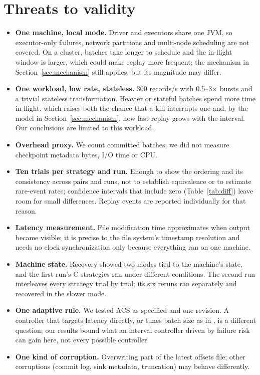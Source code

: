\documentclass[10pt,twocolumn]{article}
\begin{document}
\section{Threats to validity}
\label{sec:threats}

\begin{itemize}
\item \textbf{One machine, local mode.} Driver and executors share one JVM, so
executor-only failures, network partitions and multi-node scheduling are not
covered. On a cluster, batches take longer to schedule and the in-flight window
is larger, which could make replay more frequent; the mechanism in
Section~\ref{sec:mechanism} still applies, but its magnitude may differ.
\item \textbf{One workload, low rate, stateless.} 300 records/s with
0.5--3$\times$ bursts and a trivial stateless transformation. Heavier or
stateful batches spend more time in flight, which raises both the chance that a
kill interrupts one and, by the model in Section~\ref{sec:mechanism}, how fast
replay grows with the interval. Our conclusions are limited to this workload.
\item \textbf{Overhead proxy.} We count committed batches; we did not measure
checkpoint metadata bytes, I/O time or CPU.
\item \textbf{Ten trials per strategy and run.} Enough to show the ordering
and its consistency across pairs and runs, not to establish equivalence or to
estimate rare-event rates; confidence intervals that include zero
(Table~\ref{tab:diff}) leave room for small differences. Replay events are
reported individually for that reason.
\item \textbf{Latency measurement.} File modification time approximates when
output became visible; it is precise to the file system's timestamp resolution
and needs no clock synchronization only because everything ran on one machine.
\item \textbf{Machine state.} Recovery showed two modes tied to the machine's
state, and the first run's C strategies ran under different conditions. The
second run interleaves every strategy trial by trial; its six reruns ran
separately and recovered in the slower mode.
\item \textbf{One adaptive rule.} We tested ACS as specified and one revision.
A controller that targets latency directly, or tunes batch size as in
\cite{das2014adaptive}, is a different question; our results bound what an
interval controller driven by failure risk can gain here, not every possible
controller.
\item \textbf{One kind of corruption.} Overwriting part of the latest offsets
file; other corruptions (commit log, sink metadata, truncation) may behave
differently.
\end{itemize}
\end{document}
